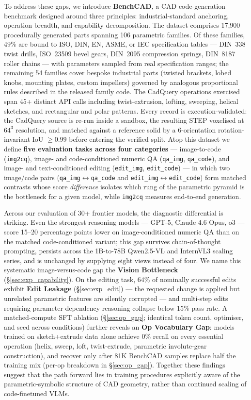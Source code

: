 \documentclass{article}
\begin{document}
To address these gaps, we introduce \textbf{BenchCAD}, a CAD code-generation benchmark designed around three principles: industrial-standard anchoring, operation breadth, and capability decomposition. The dataset comprises 17{,}900 procedurally generated parts spanning 106 parametric families. Of these families, 49\% are bound to ISO, DIN, EN, ASME, or IEC specification tables --- DIN~338 twist drills, ISO~23509 bevel gears, DIN~2095 compression springs, DIN~8187 roller chains --- with parameters sampled from real specification ranges; the remaining 54 families cover bespoke industrial parts (twisted brackets, lobed knobs, mounting plates, custom impellers) governed by analogous proportional rules described in the released family code. The CadQuery operations exercised span 45+ distinct API calls including twist-extrusion, lofting, sweeping, helical sketches, and rectangular and polar patterns. Every record is execution-validated: the CadQuery source is re-run inside a sandbox, the resulting STEP voxelised at $64^3$ resolution, and matched against a reference solid by a 6-orientation rotation-invariant IoU $\geq 0.99$ before entering the verified split. Atop this dataset we define \textbf{five evaluation tasks across four categories} --- image-to-code (\texttt{img2cq}), image- and code-conditioned numeric QA (\texttt{qa\_img}, \texttt{qa\_code}), and image- and text-conditioned editing (\texttt{edit\_img}, \texttt{edit\_code}) --- in which two image/code pairs (\texttt{qa\_img}$\leftrightarrow$\texttt{qa\_code} and \texttt{edit\_img}$\leftrightarrow$\texttt{edit\_code}) form matched contrasts whose score \emph{difference} isolates which rung of the parametric pyramid is the bottleneck for a given model, while \texttt{img2cq} measures end-to-end generation.

Across our evaluation of 30+ frontier models, the diagnostic differential is striking. Even the strongest reasoning models --- GPT-5, Claude 4.6 Opus, o3 --- score 15--20 percentage points lower on image-conditioned numeric QA than on the matched code-conditioned variant; this gap survives chain-of-thought prompting, persists across the 1B-to-78B Qwen2.5-VL and InternVL3 scaling series, and is unchanged by supplying eight views instead of four. We name this systematic image-versus-code gap the \textbf{Vision Bottleneck} (\S\ref{sec:exp_capability}). On the editing task, 64\% of nominally successful edits exhibit \textbf{Edit Leakage} (\S\ref{sec:exp_edit}) --- the requested change is applied but unrelated parametric features are silently corrupted --- and multi-step edits requiring parameter-dependency reasoning collapse below 15\% pass rate. A matched-compute SFT ablation (\S\ref{sec:op_gap}; identical token count, optimiser, and seed across conditions) further reveals an \textbf{Op Vocabulary Gap}: models trained on sketch+extrude data alone achieve 0\% recall on every essential operation (helix, sweep, loft, twist-extrude, parametric involute-gear construction), and recover only after 81K BenchCAD samples replace half the training mix (per-op breakdown in \S\ref{sec:op_gap}). Together these findings suggest that the path forward lies in training procedures explicitly aware of the parametric-symbolic structure of CAD geometry, rather than continued scaling of code-finetuned VLMs.
\end{document}
